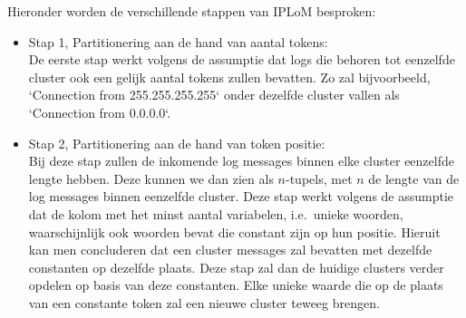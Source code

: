 Hieronder worden de verschillende stappen van IPLoM besproken: 
\begin{itemize}
    \item Stap 1, Partitionering aan de hand van aantal tokens:\\
    De eerste stap werkt volgens de assumptie dat logs die behoren tot eenzelfde cluster ook een gelijk aantal tokens zullen bevatten. Zo zal bijvoorbeeld, `Connection from 255.255.255.255` onder dezelfde cluster vallen als `Connection from 0.0.0.0`.\\
    \item Stap 2, Partitionering aan de hand van token positie:\\
    Bij deze stap zullen de inkomende log messages binnen elke cluster eenzelfde lengte hebben. Deze kunnen we dan zien als $n$-tupels, met $n$ de lengte van de log messages binnen eenzelfde cluster. Deze stap werkt volgens de assumptie dat de kolom met het minst aantal variabelen, i.e.\ unieke woorden, waarschijnlijk ook woorden bevat die constant zijn op hun positie. Hieruit kan men concluderen dat een cluster messages zal bevatten met dezelfde constanten op dezelfde plaats. Deze stap zal dan de huidige clusters verder opdelen op basis van deze constanten. Elke unieke waarde die op de plaats van een constante token zal een nieuwe cluster teweeg brengen. 
    

\end{itemize}

